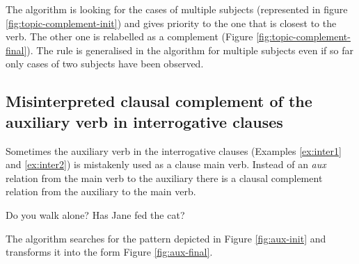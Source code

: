     The algorithm is looking for the cases of multiple subjects (represented in figure \ref{fig:topic-complement-init}) and gives priority to the one that is closest to the verb. The other one is relabelled as a complement (Figure \ref{fig:topic-complement-final}). The rule is generalised in the algorithm for multiple subjects even if so far only cases of two subjects have been observed.  

\subsection{Misinterpreted clausal complement of the auxiliary verb in interrogative clauses}
    Sometimes the auxiliary verb in the interrogative clauses (Examples \ref{ex:inter1} and \ref{ex:inter2}) is mistakenly used as a clause main verb. Instead of an \textit{aux} relation from the main verb to the auxiliary there is a clausal complement relation from the auxiliary to the main verb.

    \begin{exe}
    	\ex\label{ex:inter1} Do you walk alone?
    	\ex\label{ex:inter2} Has Jane fed the cat?
    \end{exe}

    The algorithm searches for the pattern depicted in Figure \ref{fig:aux-init} and transforms it into the form Figure \ref{fig:aux-final}. 

